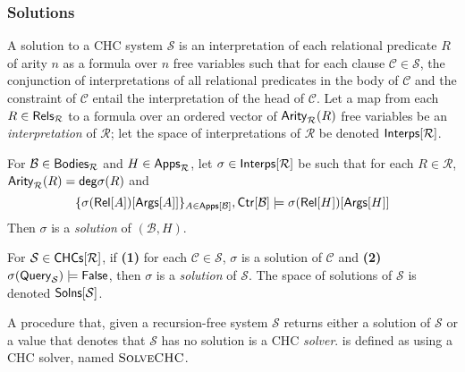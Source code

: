 \subsubsection{Solutions}
\label{sec:chc-solns}
%
A solution to a CHC system $\mathcal{S}$ is an interpretation of each
relational predicate $R$ of arity $n$ as a formula over $n$ free
variables such that for each clause $\mathcal{C} \in \mathcal{S}$, the
conjunction of interpretations of all relational predicates in the
body of $\mathcal{C}$ and the constraint of $\mathcal{C}$ entail the
interpretation of the head of $\mathcal{C}$.
%
Let a map from each $R \in \mathsf{Rels}_{ \mathcal{R} }$ to a formula over
an ordered vector of $\mathsf{Arity}_{ \mathcal{R} }(R)$ free variables be an
\emph{interpretation} of $\mathcal{R}$;
%
let the space of interpretations of $\mathcal{R}$ be denoted
$\mathsf{Interps[  \mathcal{R}  ]}$.
%
\begin{defn}
  \label{defn:chc-soln}
  For $\mathcal{B} \in \mathsf{Bodies}_{ \mathcal{R} }$ and $H \in \mathsf{Apps}_{
    \mathcal{R} }$, %
  let $\sigma \in \mathsf{Interps[  \mathcal{R}  ]}$ be such that for each $R
  \in \mathcal{R}$, $\mathsf{Arity}_{\mathcal{R}}(R) = \mathsf{deg}{\sigma(R)}$
  and %
  \[ \elts{ \sigma(\relof{ A })[ \argsof{ A } ] }_{ A \in \appsof{
      \mathcal{B} } }, %
  \ctrof{ \mathcal{B} } \entails %
  \sigma( \relof{H} )[ \argsof{ H } ]
  \]
  Then $\sigma$ is a \emph{solution} of $(\mathcal{B}, H)$.
\end{defn}
For $\mathcal{S} \in \mathsf{CHCs}[  \mathcal{R}  ]$, if %
\textbf{(1)} for each $\mathcal{C} \in \mathcal{S}$, $\sigma$ is a
solution of $\mathcal{C}$ and %
\textbf{(2)} $\sigma(\mathsf{Query}_{ \mathcal{S} }) \models \mathsf{False}$, then
$\sigma$ is a \emph{solution} of $\mathcal{S}$.
%
The space of solutions of $\mathcal{S}$ is denoted $\mathsf{Solns}[ 
  \mathcal{S}  ]$.

A procedure that, given a recursion-free system $\mathcal{S}$ returns
either a solution of $\mathcal{S}$ or a value that denotes that
$\mathcal{S}$ has no solution is a CHC \emph{solver}.
%
\sys is defined as using a CHC solver, named $\textsc{SolveCHC}$.

